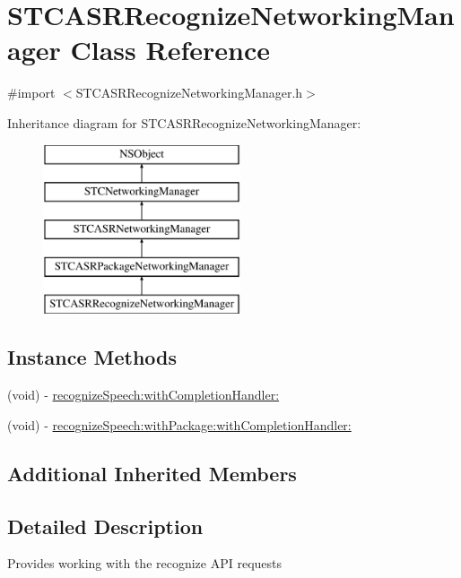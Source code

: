 \hypertarget{interface_s_t_c_a_s_r_recognize_networking_manager}{}\section{S\+T\+C\+A\+S\+R\+Recognize\+Networking\+Manager Class Reference}
\label{interface_s_t_c_a_s_r_recognize_networking_manager}


{\ttfamily \#import $<$S\+T\+C\+A\+S\+R\+Recognize\+Networking\+Manager.\+h$>$}

Inheritance diagram for S\+T\+C\+A\+S\+R\+Recognize\+Networking\+Manager\+:\begin{figure}[H]
\begin{center}
\leavevmode
\includegraphics[height=5.000000cm]{interface_s_t_c_a_s_r_recognize_networking_manager}
\end{center}
\end{figure}
\subsection*{Instance Methods}
\begin{DoxyCompactItemize}
\item 
(void) -\/ \hyperlink{interface_s_t_c_a_s_r_recognize_networking_manager_a464f2bc061d7a95fda633c8d59a38b68}{recognize\+Speech\+:with\+Completion\+Handler\+:}
\item 
(void) -\/ \hyperlink{interface_s_t_c_a_s_r_recognize_networking_manager_a207d9ab2e972ca580bd7b251f98d7640}{recognize\+Speech\+:with\+Package\+:with\+Completion\+Handler\+:}
\end{DoxyCompactItemize}
\subsection*{Additional Inherited Members}


\subsection{Detailed Description}
Provides working with the recognize A\+PI requests 

